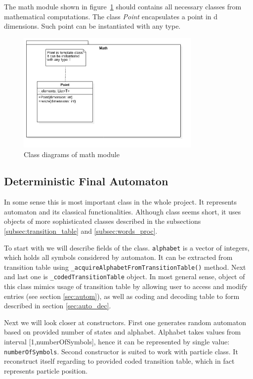 \documentclass{article}
\begin{document}
The math module shown in figure~\ref{fig:math_class} should contains all necessary classes from mathematical computations. The class \textit{Point} encapsulates a point in d dimensions. Such point can be instantiated with any type.

%
%
\begin{figure}[H]
	\centering
	\includegraphics[width=0.8\textwidth]{images/math_class.jpg}
    \caption{Class diagrams of math module}
    \label{fig:math_class}
\end{figure}





%
%
\newpage
\subsection{Deterministic Final Automaton}
In some sense this is most important class in the whole project. It represents automaton and its classical functionalities. Although class seems short, it uses objects of more sophisticated classes described in the subsections \ref{subsec:transition_table} and \ref{subsec:words_proc}. 

To start with we will describe fields of the class. \texttt{alphabet} is a vector of integers, which holds all symbols considered by automaton. It can be extracted from transition table using \texttt{\_acquireAlphabetFromTransitionTable()} method. Next and last one is \texttt{\_codedTransitionTable} object. In most general sense, object of this class mimics usage of transition table by allowing user to access and modify entries (see section \ref{sec:autom}), as well as coding and decoding table to form described in section \ref{sec:auto_dec}. 

Next we will look closer at constructors. First one generates random automaton based on provided number of states and alphabet. Alphabet takes values from interval [1,numberOfSymbols], hence it can be represented by single value: \texttt{numberOfSymbols}. Second constructor is suited to work with particle class. It reconstruct itself regarding to provided coded transition table, which in fact represents particle position. 
\end{document}
